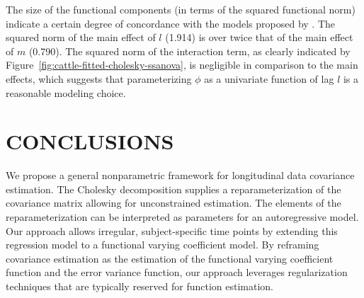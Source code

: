 \documentclass[12pt]{article}
\begin{document}
The size of the functional components (in terms of the squared functional norm) indicate a certain degree of concordance with the models proposed by \cite{pourahmadi1999joint}. The squared norm of the main effect of $l$ (1.914) is over twice that of the main effect of $m$ (0.790). The squared norm of the interaction term, as clearly indicated by Figure~\ref{fig:cattle-fitted-cholesky-ssanova}, is negligible in comparison to the main effects, which suggests that parameterizing $\phi$ as a univariate function of lag $l$ is a reasonable modeling choice. 
\section*{\sffamily \Large CONCLUSIONS}
We propose a general nonparametric framework for longitudinal data covariance estimation. The Cholesky decomposition supplies a reparameterization of the covariance matrix allowing for unconstrained estimation. The elements of the reparameterization can be interpreted as parameters for an autoregressive model. Our approach allows irregular, subject-specific time points by extending this regression model to a functional varying coefficient model. By reframing covariance estimation as the estimation of the functional varying coefficient function and the error variance function, our approach leverages regularization techniques that are typically reserved for function estimation.  


%
%
%
\end{document}
